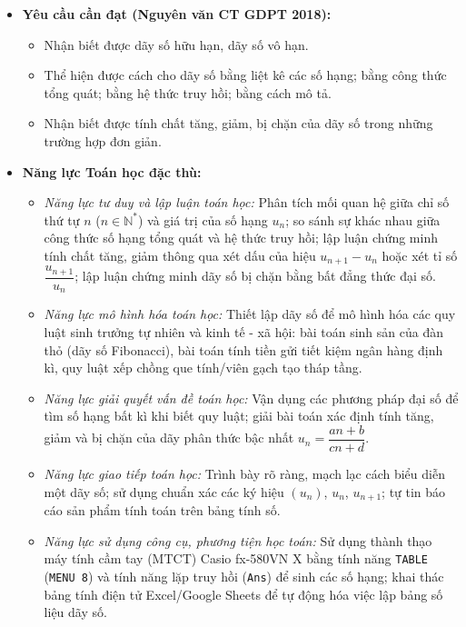 \documentclass[12pt, a4paper]{article}
\begin{document}
\begin{itemize}[leftmargin=1.2cm]  
    \item \textbf{Yêu cầu cần đạt (Nguyên văn CT GDPT 2018):}  
    \begin{itemize}[leftmargin=0.6cm]  
        \item Nhận biết được dãy số hữu hạn, dãy số vô hạn.  
        \item Thể hiện được cách cho dãy số bằng liệt kê các số hạng; bằng công thức tổng quát; bằng hệ thức truy hồi; bằng cách mô tả.  
        \item Nhận biết được tính chất tăng, giảm, bị chặn của dãy số trong những trường hợp đơn giản.  
    \end{itemize}  
  
    \item \textbf{Năng lực Toán học đặc thù:}  
    \begin{itemize}[leftmargin=0.6cm]  
        \item \textit{Năng lực tư duy và lập luận toán học:} Phân tích mối quan hệ giữa chỉ số thứ tự $n$ ($n \in \mathbb{N}^*$) và giá trị của số hạng $u_n$; so sánh sự khác nhau giữa công thức số hạng tổng quát và hệ thức truy hồi; lập luận chứng minh tính chất tăng, giảm thông qua xét dấu của hiệu $u_{n+1} - u_n$ hoặc xét tỉ số $\dfrac{u_{n+1}}{u_n}$; lập luận chứng minh dãy số bị chặn bằng bất đẳng thức đại số.  
        \item \textit{Năng lực mô hình hóa toán học:} Thiết lập dãy số để mô hình hóa các quy luật sinh trưởng tự nhiên và kinh tế - xã hội: bài toán sinh sản của đàn thỏ (dãy số Fibonacci), bài toán tính tiền gửi tiết kiệm ngân hàng định kì, quy luật xếp chồng que tính/viên gạch tạo tháp tầng.  
        \item \textit{Năng lực giải quyết vấn đề toán học:} Vận dụng các phương pháp đại số để tìm số hạng bất kì khi biết quy luật; giải bài toán xác định tính tăng, giảm và bị chặn của dãy phân thức bậc nhất $u_n = \dfrac{an+b}{cn+d}$.  
        \item \textit{Năng lực giao tiếp toán học:} Trình bày rõ ràng, mạch lạc cách biểu diễn một dãy số; sử dụng chuẩn xác các ký hiệu $(u_n)$, $u_n$, $u_{n+1}$; tự tin báo cáo sản phẩm tính toán trên bảng tính số.  
        \item \textit{Năng lực sử dụng công cụ, phương tiện học toán:} Sử dụng thành thạo máy tính cầm tay (MTCT) Casio fx-580VN X bằng tính năng \texttt{TABLE} (\texttt{MENU 8}) và tính năng lặp truy hồi (\texttt{Ans}) để sinh các số hạng; khai thác bảng tính điện tử Excel/Google Sheets để tự động hóa việc lập bảng số liệu dãy số.  
    \end{itemize}  
  

\end{itemize}
\end{document}
